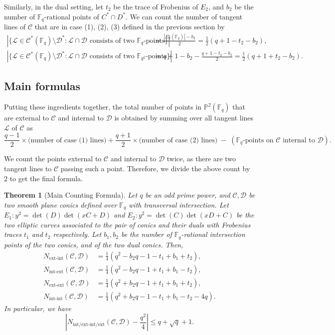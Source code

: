\documentclass[11pt]{article}
\newtheorem{thm}[defn]{Theorem}
\theoremstyle{definition}
\theoremstyle{definition}
\begin{document}
Similarly, in the dual setting, let $t_2$ be the trace of Frobenius of $E_2$, and $b_2$ be the number of $\mathbb{F}_q$-rational points of $C^*\cap D^*$. We can count the number of tangent lines of $\mathcal{C}$ that are in case (1), (2), (3) defined in the previous section by
\begin{align*}
    |\{\mathcal L\in \mathcal{C}^*(\mathbb{F}_q)\setminus\mathcal{D}^*: \mathcal L\cap \mathcal{D} \text{ consists of two }\mathbb{F}_q\text{-points}\}| &= \frac{|E_2(\mathbb{F}_q)|-b_2}{2} = \frac{1}{2}(q+1-t_2-b_2), \\
    |\{\mathcal L\in \mathcal{C}^*(\mathbb{F}_q)\setminus\mathcal D^*: \mathcal L\cap \mathcal{D} \text{ consists of two }\mathbb{F}_{q^2}\text{-points}\}| &= q+1-b_2-\frac{q+1-t_2-b_2}{2} = \frac{1}{2}(q+1+t_2-b_2).
\end{align*}

\subsection*{Main formulas}

Putting these ingredients together, the total number of points in $\mathbb{P}^2(\mathbb{F}_q)$ that are external to $\mathcal C$ and internal to $\mathcal D$ is obtained by summing over all tangent lines $\mathcal L$ of $\mathcal C$ as 
\[
\frac{q - 1}{2} \times \text{(number of case (1) lines)} + \frac{q+1}{2}\times \text{(number of case (2) lines)}
  \;-\; (\mathbb{F}_q\text{-points on }\mathcal{C} \text{ internal to } \mathcal{D}) .
\]

We count the points external to $\mathcal{C}$ and internal to $\mathcal{D}$ twice, as there are two tangent lines to $\mathcal{C}$ passing such a point. Therefore, we divide the above count by $2$ to get the final formula. 

\begin{thm}[Main Counting Formula]\label{thm: main_conic_case}
Let $q$ be an odd prime power, and $\mathcal C, \mathcal D$ be two smooth plane conics defined over $\mathbb{F}_q$ with transversal intersection. Let \(E_1: y^2 = \det(D)\det(xC + D)\) and \(E_2: y^2 = \det(C)\det(xD + C)\) be the two elliptic curves associated to the pair of conics and their duals with Frobenius traces $t_1$ and $t_2$ respectively. Let $b_1,b_2$ be the number of $\mathbb{F}_q$-rational intersection points of the two conics, and of the two dual conics. Then,
\begin{align*}
    N_{\mathrm{ext\text{-}int}}(\mathcal C,\mathcal D) &= \frac{1}{4}\left(q^2-b_2q-1-t_1+b_1+t_2\right) ,\\ 
    N_{\mathrm{int\text{-}ext}}(\mathcal C,\mathcal D) &= \frac{1}{4}\left(q^2-b_2q-1+t_1+b_1-t_2\right) ,\\
    N_{\mathrm{ext\text{-}ext}}(\mathcal C,\mathcal D) &= \frac{1}{4}\left(q^2+b_2q-1+t_1+b_1+t_2\right) ,\\
    N_{\mathrm{int\text{-}int}}(\mathcal C,\mathcal D) &= \frac{1}{4}\left(q^2+b_2q-1-t_1+b_1-t_2-4q\right).
\end{align*}
In particular, we have 
$$\left|N_{\mathrm{int/ext\text{-}int/ext}}(\mathcal{C}, \mathcal{D}) - \frac{q^2}{4}\right|\leq q+\sqrt{q}+1.$$
\end{thm}
\end{document}
